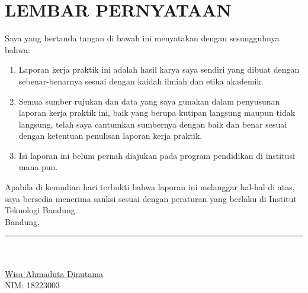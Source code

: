 \chapter*{LEMBAR PERNYATAAN}
\vspace{2cm}
Saya yang bertanda tangan di bawah ini menyatakan dengan sesungguhnya bahwa:
\begin{enumerate}
    \item Laporan kerja praktik ini adalah hasil karya saya sendiri yang dibuat dengan sebenar-benarnya sesuai dengan kaidah ilmiah dan etika akademik.
    \item Semua sumber rujukan dan data yang saya gunakan dalam penyusunan laporan kerja praktik ini, baik yang berupa kutipan langsung maupun tidak langsung, telah saya cantumkan sumbernya dengan baik dan benar sesuai dengan ketentuan penulisan laporan kerja praktik.
    \item Isi laporan ini belum pernah diajukan pada program pendidikan di institusi mana pun.
\end{enumerate}
Apabila di kemudian hari terbukti bahwa laporan ini melanggar hal-hal di atas, saya bersedia menerima sanksi sesuai dengan peraturan yang berlaku di Institut Teknologi Bandung.
\\[2cm]
Bandung, \rule{3cm}{0.4pt}\\
\\[2cm]

\underline{Wisa Ahmaduta Dinutama} \\
NIM: 18223003
